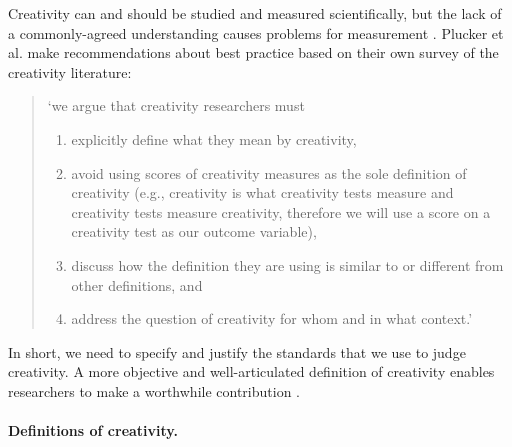 \documentclass[10pt,letterpaper]{article}
\begin{document}
Creativity can and should be studied and measured scientifically, but the lack of a commonly-agreed understanding causes problems for measurement \cite{kaufman09}. Plucker et al. make recommendations about best practice based on their own survey of the creativity literature:
\begin{quote}
\noindent
`we argue that creativity researchers must

\begin{enumerate}
\renewcommand{\labelenumi}{(\alph{enumi})}
\item explicitly define what they mean by creativity,
\item avoid using scores of creativity measures as the sole definition of creativity (e.g., creativity is what creativity tests measure and creativity tests measure creativity, therefore we will use a score on a creativity test as our outcome variable),
\item discuss how the definition they are using is similar to or different from other definitions, and
\item address the question of creativity for whom and in what context.' \cite[p.92]{plucker04defn}
\end{enumerate}
\end{quote}

\noindent In short, we need to specify and justify the standards that we use to judge creativity. A more objective and well-articulated definition of creativity enables researchers to make a worthwhile contribution \cite{torrance67,plucker04defn,kaufman09}. 

\paragraph{Definitions of creativity.}
\label{existing_defs}
\end{document}
